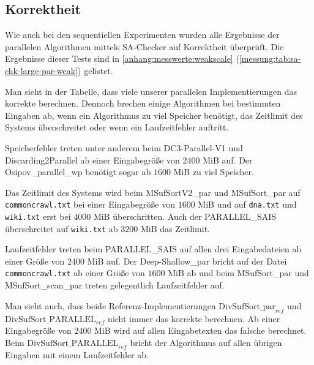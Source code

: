 \subsection{\sa Korrektheit}

Wie auch bei den sequentiellen Experimenten wurden alle Ergebnisse der parallelen Algorithmen mittels SA-Checker auf Korrektheit überprüft.
Die Ergebnisse dieser Tests sind in \cref{anhang:messwerte:weakscale} (\cref{messung:tab:sa-chk-large-par-weak}) gelistet.

Man sieht in der Tabelle, dass viele unserer parallelen Implementierungen das korrekte \sa berechnen. Dennoch brechen einige Algorithmen bei bestimmten Eingaben ab, wenn ein Algorithmus zu viel Speicher benötigt, das Zeitlimit des Systems überschreitet oder wenn ein Laufzeitfehler auftritt. \par
Speicherfehler treten unter anderem beim DC3-Parallel-V1 und Discarding2\-Parallel ab einer Eingabegröße von $2400$ MiB auf. Der Osipov\_parallel\_wp benötigt sogar ab $1600$ MiB zu viel Speicher. \par
Das Zeitlimit des Systems wird beim MSufSortV2\_par und MSufSort\_par auf \texttt{commoncrawl.txt} bei einer Eingabegröße von $1600$ MiB und auf \texttt{dna.txt} und \texttt{wiki.txt} erst bei $4000$ MiB überschritten. Auch der PARALLEL\_SAIS überschreitet auf \texttt{wiki.txt} ab $3200$ MiB das Zeitlimit. \par
Laufzeitfehler treten beim PARALLEL\_SAIS auf allen drei Eingabedateien ab einer Größe von $2400$ MiB auf. Der Deep-Shallow\_par bricht auf der Datei \texttt{commoncrawl.txt} ab einer Größe von $1600$ MiB ab und beim MSufSort\_par und MSufSort\_scan\_par treten gelegentlich Laufzeitfehler auf. \par
Man sieht auch, dass beide Referenz-Implementierungen $\text{DivSufSort\_par}_{ref}$ und $\text{DivSufSort\_PARALLEL}_{ref}$ nicht immer das korrekte \sa berechnen. Ab einer Eingabegröße von $2400$ MiB wird auf allen Eingabetexten das falsche \sa berechnet. Beim $\text{DivSufSort\_PARALLEL}_{ref}$ bricht der Algorithmus auf allen übrigen Eingaben mit einem Laufzeitfehler ab.
